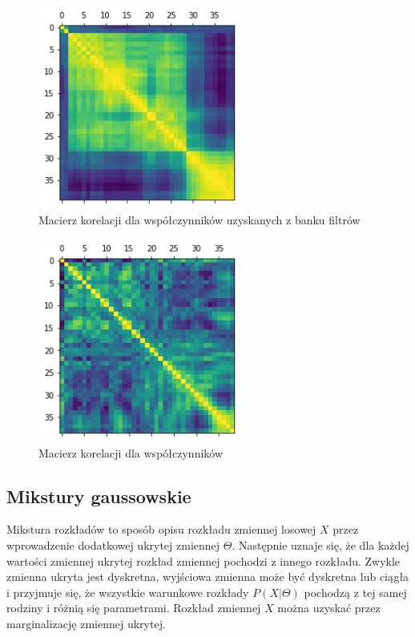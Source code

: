 \begin{figure}[H]
    \centering
    \includegraphics[width=0.6\textwidth]{images/2_1_f_correlation_matrix_banks}
    \caption{Macierz korelacji dla współczynników uzyskanych z banku filtrów}
    \label{fig:2_1_f_correlation_matrix_banks}
\end{figure}

\begin{figure}[H]
    \centering
    \includegraphics[width=0.6\textwidth]{images/2_1_g_correlation_matrix_mfcc}
    \caption{Macierz korelacji dla współczynników }
    \label{fig:2_1_g_correlation_matrix_mfcc}
\end{figure}

\subsection{Mikstury gaussowskie}\label{sec:gmm}

Mikstura rozkładów to sposób opisu rozkładu zmiennej losowej $X$ przez wprowadzenie dodatkowej ukrytej zmiennej $\Theta$.
Następnie uznaje się, że dla każdej wartości zmiennej ukrytej rozkład zmiennej pochodzi z innego rozkładu.
Zwykle zmienna ukryta jest dyskretna, wyjściowa zmienna może być dyskretna lub ciągła i przyjmuje się, że wszystkie
warunkowe rozkłady $P(X|\Theta)$ pochodzą z tej samej rodziny i różnią się parametrami. Rozkład zmiennej $X$ można
uzyskać przez marginalizację zmiennej ukrytej.

